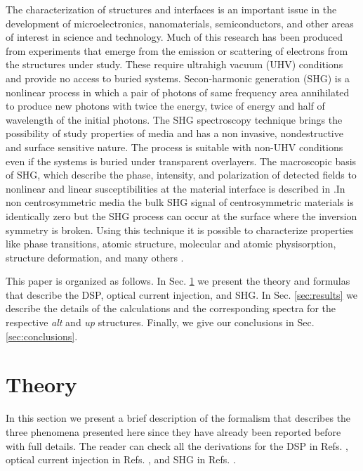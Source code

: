 \documentclass[pss]{wiley2sp} %
\begin{document}
The characterization of structures and interfaces is an important issue in the development of microelectronics, nanomaterials, semiconductors, and other areas of interest in science and technology. Much of this research has been produced from experiments that emerge from the emission or scattering of electrons from the structures under study. These require ultrahigh vacuum (UHV) conditions and provide no access to buried systems. Secon-harmonic generation (SHG) is a nonlinear process in which a pair of photons of same frequency area annihilated to produce new photons with twice the energy, twice of energy and half of wavelength of the initial photons. The SHG spectroscopy technique brings the possibility of study properties of media and has a non invasive, nondestructive and surface sensitive nature. The process is suitable with non-UHV conditions even if the systems is buried under transparent overlayers. The macroscopic basis of SHG, which describe the phase, intensity, and polarization of detected fields to nonlinear and linear susceptibilities at the material interface is described in \cite{downerSIA01}.In non centrosymmetric media the bulk SHG signal of centrosymmetric materials is identically zero but the SHG process can occur at the surface where the inversion symmetry is broken. Using this technique it is possible to characterize properties like phase transitions, atomic structure, molecular and atomic physisorption, structure deformation, and many others \cite{dadapPRB97,godefroyAPL96,salazarPRB14,mendozaPRL98}. 

This paper is organized as follows. In Sec. \ref{sec:theory} we present the theory and formulas that describe the DSP, optical current injection, and SHG. In Sec. \ref{sec:results} we describe the details of the calculations and the corresponding spectra for the respective \emph{alt} and \emph{up} structures. Finally, we give our conclusions in Sec. \ref{sec:conclusions}.


\section{Theory}\label{sec:theory}

In this section we present a brief description of the formalism that describes the three phenomena presented here since they have already been reported before with full details. The reader can check all the derivations for the DSP in Refs. \cite{nastosPRB07,mendozaPRB12}, optical current injection in Refs. \cite{cabellosPRB11,sipePRB00}, and SHG in Refs. \cite{nastosPRB05,andersonPRB15}.
\end{document}
